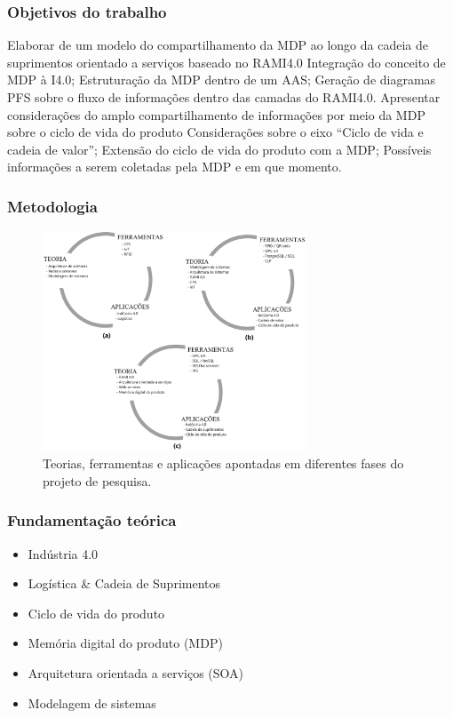 \documentclass[10pt]{beamer}
\begin{document}
\begin{frame}
	\frametitle{Objetivos do trabalho}
	
	\begin{outline}[enumerate]
		\1 Elaborar de um modelo do compartilhamento da MDP ao longo da cadeia de suprimentos orientado a serviços baseado no RAMI4.0
			\2 Integração do conceito de MDP à I4.0;
			\2 Estruturação da MDP dentro de um AAS;
			\2 Geração de diagramas PFS sobre o fluxo de informações dentro das camadas do RAMI4.0.
		\1 Apresentar considerações do amplo compartilhamento de informações por meio da MDP sobre o ciclo de vida do produto
			\2 Considerações sobre o eixo ``Ciclo de vida e cadeia de valor'';
			\2 Extensão do ciclo de vida do produto com a MDP;
			\2 Possíveis informações a serem coletadas pela MDP e em que momento.
	\end{outline}

\end{frame}

\begin{frame}
	\frametitle{Metodologia}
	
	\begin{figure}[htb]
		\centering
		\caption{Teorias, ferramentas e aplicações apontadas em diferentes fases do projeto de pesquisa.}
		\label{fig:metodologia-jensen-projeto}
		\includegraphics[width=0.7\textwidth]{metodologia-jensen-projeto.png}
	\end{figure}
	
\end{frame}
\begin{frame}
	\frametitle{Fundamentação teórica}
	
	\begin{itemize}
		\item Indústria 4.0
		\item Logística \& Cadeia de Suprimentos
		\item Ciclo de vida do produto
		\item Memória digital do produto (MDP)
		\item Arquitetura orientada a serviços (SOA)
		\item Modelagem de sistemas
	\end{itemize}
	
\end{frame}
\end{document}

